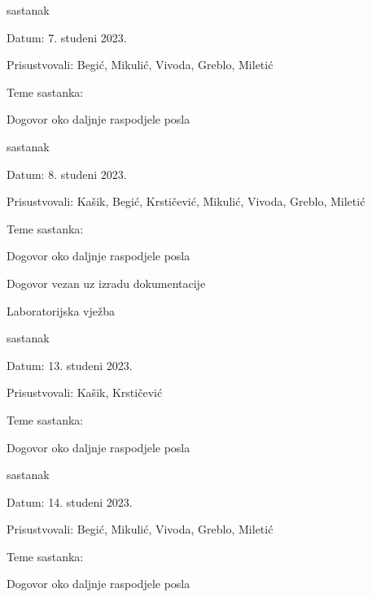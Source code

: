 \begin{packed_enum}
	\item  sastanak
	\item[] \begin{packed_item}
		\item Datum: 7. studeni 2023.
		\item Prisustvovali: Begić, Mikulić, Vivoda, Greblo, Miletić
		\item Teme sastanka:
		\begin{packed_item}
			\item  Dogovor oko daljnje raspodjele posla
		\end{packed_item}
	\end{packed_item}
	
	\item  sastanak
	\item[] \begin{packed_item}
		\item Datum: 8. studeni 2023.
		\item Prisustvovali: Kašik, Begić, Krstičević, Mikulić, Vivoda, Greblo, Miletić
		\item Teme sastanka:
		\begin{packed_item}
			\item  Dogovor oko daljnje raspodjele posla
			\item  Dogovor vezan uz izradu dokumentacije
			\item  Laboratorijska vježba
		\end{packed_item}
	\end{packed_item}
	
	\item  sastanak
	\item[] \begin{packed_item}
		\item Datum: 13. studeni 2023.
		\item Prisustvovali: Kašik, Krstičević
		\item Teme sastanka:
		\begin{packed_item}
			\item  Dogovor oko daljnje raspodjele posla
		\end{packed_item}
	\end{packed_item}
	
	\item  sastanak
	\item[] \begin{packed_item}
		\item Datum: 14. studeni 2023.
		\item Prisustvovali: Begić, Mikulić, Vivoda, Greblo, Miletić
		\item Teme sastanka:
		\begin{packed_item}
			\item  Dogovor oko daljnje raspodjele posla
		\end{packed_item}
	\end{packed_item}
	

\end{packed_enum}
